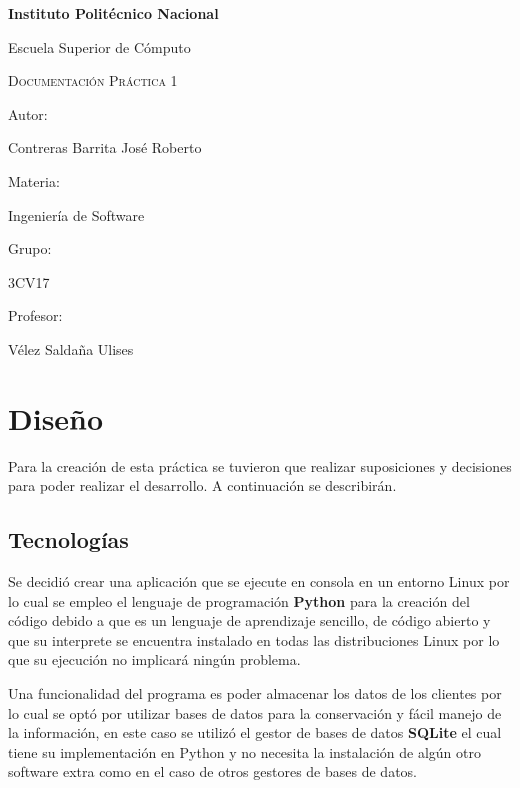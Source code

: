 \documentclass[12pt]{article}
\begin{document}
	\begin{titlepage}
		\centering
		{\bfseries\LARGE Instituto Politécnico Nacional \par}
		\vspace{0cm}
		{\Large Escuela Superior de Cómputo  \par}
		\vspace{1cm}
		{\scshape\Huge Documentación Práctica 1 \par}
		\vspace{1cm}
		{\Large Autor: \par}
		{\Large Contreras Barrita José Roberto \par}
		\vspace{1cm}
		{\Large Materia: \par}
		{\Large Ingeniería de Software \par}
		\vspace{1cm}
		{\Large Grupo: \par}
		{\Large 3CV17 \par}
		\vspace{1cm}
		{\Large Profesor: \par}
		{\Large Vélez Saldaña Ulises \par}
	\end{titlepage}
	
	\tableofcontents
	\clearpage
	
	\section{Diseño}
		Para la creación de esta práctica se tuvieron que realizar suposiciones y decisiones para poder realizar el desarrollo. A continuación se describirán.
		
		\subsection{Tecnologías}
			Se decidió crear una aplicación que se ejecute en consola en un entorno Linux por lo cual se empleo el lenguaje de programación \textbf{Python} para la creación del código debido a que es un lenguaje de aprendizaje sencillo, de código abierto y que su interprete se encuentra instalado en todas las distribuciones Linux por lo que su ejecución no implicará ningún problema.
			
			
			Una funcionalidad del programa es poder almacenar los datos de los clientes por lo cual se optó por utilizar bases de datos para la conservación y fácil manejo de la información, en este caso se utilizó el gestor de bases de datos \textbf{SQLite} el cual tiene su implementación en Python y no necesita la instalación de algún otro software extra como en el caso de otros gestores de bases de datos.
			
\end{document}
